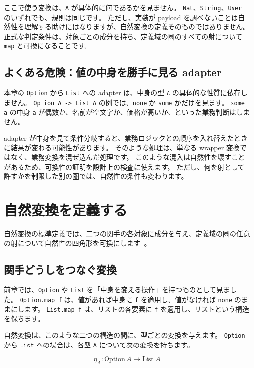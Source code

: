 ここで使う変換は、\texttt{A} が具体的に何であるかを見ません。
\texttt{Nat}、\texttt{String}、\texttt{User} のいずれでも、規則は同じです。
ただし、実装が payload を調べないことは自然性を理解する助けにはなりますが、自然変換の定義そのものではありません。
正式な判定条件は、対象ごとの成分を持ち、定義域の圏のすべての射について \texttt{map} と可換になることです。

\subsection{よくある危険：値の中身を勝手に見る adapter}

本章の \texttt{Option} から \texttt{List} への adapter は、中身の型 \texttt{A} の具体的な性質に依存しません。
\texttt{Option A -> List A} の例では、\texttt{none} か \texttt{some} かだけを見ます。
\texttt{some a} の中身 \texttt{a} が偶数か、名前が空文字か、価格が高いか、といった業務判断はしません。

adapter が中身を見て条件分岐すると、業務ロジックとの順序を入れ替えたときに結果が変わる可能性があります。
そのような処理は、単なる wrapper 変換ではなく、業務変換を混ぜ込んだ処理です。
このような混入は自然性を壊すことがあるため、可換性の証明を設計上の検査に使えます。
ただし、何を射として許すかを制限した別の圏では、自然性の条件も変わります。

\section{自然変換を定義する}

自然変換の標準定義では、二つの関手の各対象に成分を与え、定義域の圏の任意の射について自然性の四角形を可換にします~\cite{riehl-category-theory-in-context}。

\subsection{関手どうしをつなぐ変換}

前章では、\texttt{Option} や \texttt{List} を「中身を変える操作」を持つものとして見ました。
\texttt{Option.map f} は、値があれば中身に \texttt{f} を適用し、値がなければ \texttt{none} のままにします。
\texttt{List.map f} は、リストの各要素に \texttt{f} を適用し、リストという構造を保ちます。

自然変換は、このような二つの構造の間に、型ごとの変換を与えます。
\texttt{Option} から \texttt{List} への場合は、各型 \texttt{A} について次の変換を持ちます。

\[
  \eta_A : \mathrm{Option}\ A \to \mathrm{List}\ A
\]

